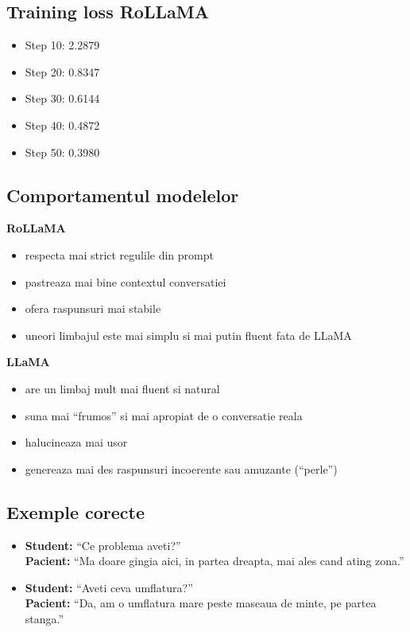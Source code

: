 \documentclass{article}
\begin{document}
\subsection{Training loss RoLLaMA}
\begin{itemize}
    \item Step 10: 2.2879
    \item Step 20: 0.8347
    \item Step 30: 0.6144
    \item Step 40: 0.4872
    \item Step 50: 0.3980
\end{itemize}


\subsection{Comportamentul modelelor}

\textbf{RoLLaMA}
\begin{itemize}
    \item respecta mai strict regulile din prompt
    \item pastreaza mai bine contextul conversatiei
    \item ofera raspunsuri mai stabile
    \item uneori limbajul este mai simplu si mai putin fluent fata de LLaMA
\end{itemize}

\textbf{LLaMA}
\begin{itemize}
    \item are un limbaj mult mai fluent si natural
    \item suna mai ``frumos'' si mai apropiat de o conversatie reala
    \item halucineaza mai usor
    \item genereaza mai des raspunsuri incoerente sau amuzante (``perle'')
\end{itemize}


\subsection{Exemple corecte}

\begin{itemize}
    \item \textbf{Student:} ``Ce problema aveti?'' \\
    \textbf{Pacient:} ``Ma doare gingia aici, in partea dreapta, mai ales cand ating zona.''
    
    \item \textbf{Student:} ``Aveti ceva umflatura?'' \\
    \textbf{Pacient:} ``Da, am o umflatura mare peste maseaua de minte, pe partea stanga.''
\end{itemize}
\end{document}
